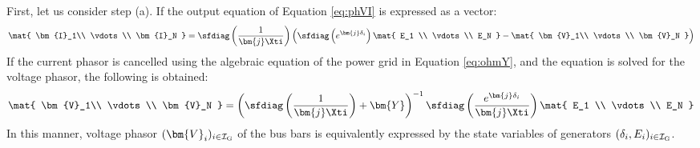 \documentclass[graybox, envcountchap]{svmult}
\begin{document}
First, let us consider step (a).
If the output equation of Equation \ref{eq:phVI} is expressed as a vector:
\[
\mat{
\bm{I}_1\\
\vdots \\
\bm{I}_N
}
=
\sfdiag \left(
\frac{1}{\bm{j} \Xti }
\right)
\left(
\sfdiag \left(
e^{\bm{j} \delta_i}
\right)
\mat{
E_1  \\
\vdots \\
E_N 
}
-
\mat{
\bm{V}_1\\
\vdots \\
\bm{V}_N
}
\right)
\]
If the current phasor is cancelled using the algebraic equation of the power grid in Equation \ref{eq:ohmY}, and the equation is solved for the voltage phasor, the following is obtained:
\begin{equation}\label{eq:colVi}
\mat{
\bm{V}_1\\
\vdots \\
\bm{V}_N
} =
\left(
\sfdiag \left(
\frac{1}{\bm{j} \Xti }
\right) + 
\bm{Y}
\right)^{-1}
\sfdiag\left(
\frac{e^{\bm{j} \delta_i}}{\bm{j} \Xti }
\right)
\mat{
E_1  \\
\vdots \\
E_N 
}
\end{equation}
In this manner, voltage phasor $(\bm{V}_i)_{i\in \mathcal{I}_{\rm G}}$ of the bus bars is equivalently expressed by the state variables of generators $(\delta_i,E_i)_{i\in \mathcal{I}_{\rm G}}$.
\end{document}
